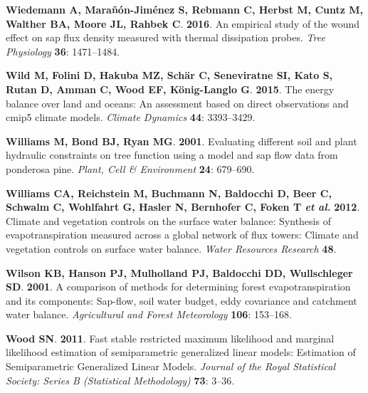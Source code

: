\documentclass[11pt,twoside]{reedthesis}
\begin{document}
\hypertarget{ref-Wiedemann2016}{}
\textbf{\textnormal{Wiedemann A}, \textnormal{Marañón-Jiménez S},
\textnormal{Rebmann C}, \textnormal{Herbst M}, \textnormal{Cuntz M},
\textnormal{Walther BA}, \textnormal{Moore JL}, \textnormal{Rahbek C}}.
\textbf{2016}. An empirical study of the wound effect on sap flux
density measured with thermal dissipation probes. \emph{Tree Physiology}
\textbf{36}: 1471--1484.

\hypertarget{ref-Wild2015}{}
\textbf{\textnormal{Wild M}, \textnormal{Folini D}, \textnormal{Hakuba
MZ}, \textnormal{Schär C}, \textnormal{Seneviratne SI}, \textnormal{Kato
S}, \textnormal{Rutan D}, \textnormal{Amman C}, \textnormal{Wood EF},
\textnormal{König-Langlo G}}. \textbf{2015}. The energy balance over
land and oceans: An assessment based on direct observations and cmip5
climate models. \emph{Climate Dynamics} \textbf{44}: 3393--3429.

\hypertarget{ref-Williams2001}{}
\textbf{\textnormal{Williams M}, \textnormal{Bond BJ}, \textnormal{Ryan
MG}}. \textbf{2001}. Evaluating different soil and plant hydraulic
constraints on tree function using a model and sap flow data from
ponderosa pine. \emph{Plant, Cell \& Environment} \textbf{24}: 679--690.

\hypertarget{ref-williams_climate_2012}{}
\textbf{\textnormal{Williams CA}, \textnormal{Reichstein M},
\textnormal{Buchmann N}, \textnormal{Baldocchi D}, \textnormal{Beer C},
\textnormal{Schwalm C}, \textnormal{Wohlfahrt G}, \textnormal{Hasler N},
\textnormal{Bernhofer C}, \textnormal{Foken T} \emph{et al.}}
\textbf{2012}. Climate and vegetation controls on the surface water
balance: Synthesis of evapotranspiration measured across a global
network of flux towers: Climate and vegetation controls on surface water
balance. \emph{Water Resources Research} \textbf{48}.

\hypertarget{ref-Wilson2001}{}
\textbf{\textnormal{Wilson KB}, \textnormal{Hanson PJ},
\textnormal{Mulholland PJ}, \textnormal{Baldocchi DD},
\textnormal{Wullschleger SD}}. \textbf{2001}. A comparison of methods
for determining forest evapotranspiration and its components: Sap-flow,
soil water budget, eddy covariance and catchment water balance.
\emph{Agricultural and Forest Meteorology} \textbf{106}: 153--168.

\hypertarget{ref-wood_fast_2011}{}
\textbf{\textnormal{Wood SN}}. \textbf{2011}. Fast stable restricted
maximum likelihood and marginal likelihood estimation of semiparametric
generalized linear models: Estimation of Semiparametric Generalized
Linear Models. \emph{Journal of the Royal Statistical Society: Series B
(Statistical Methodology)} \textbf{73}: 3--36.
\end{document}
